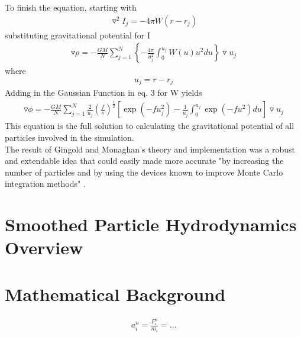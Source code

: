\documentclass{sigchi}
\begin{document}
To finish the equation, starting with
\begin{align}
\triangledown^2I_j = -4 \pi W(r - r_j)
\end{align}
substituting gravitational potential for I
\begin{align}
\triangledown \rho = - \frac{GM}{N} \sum_{j=1}^N \left \lbrace - \frac{4 \pi}{u_j^2} \int_{0}^{u_j} 
W(u) u^2 du \right \rbrace \triangledown u_j
\end{align}
where
\begin{align}
u_j = r - r_j
\end{align}
Adding in the Gaussian Function in eq. 3 for W yields
\begin{align}
\triangledown \phi = - \frac{GM}{N} \sum_{j=1}^N \frac{2}{u_j} \left ( \frac{f}{\pi} \right )^\frac{1}{2} 
\left \lbrack \exp{(-f u_j^2)} - \frac{1}{u_j} \int_{0}^{u_j} \exp{(-f u^2)} du \right \rbrack 
\triangledown u_j
\end{align}
This equation is the full solution to calculating the gravitational potential of all particles
involved in the simulation.
\\
\hspace*{6 pt} The result of Gingold and Monaghan's theory and implementation was a robust 
and extendable idea that could easily made more accurate "by increasing the number of particles 
and by using the devices known to improve Monte Carlo integration methods" \cite{sphastrophysics}.
%

\section{Smoothed Particle Hydrodynamics Overview}
%

%

\section{Mathematical Background}
%
\begin{align}
	a_i^n = \frac{F_i^n}{m_i} = \dots
	\label{math:acceleration}
\end{align}
\end{document}
